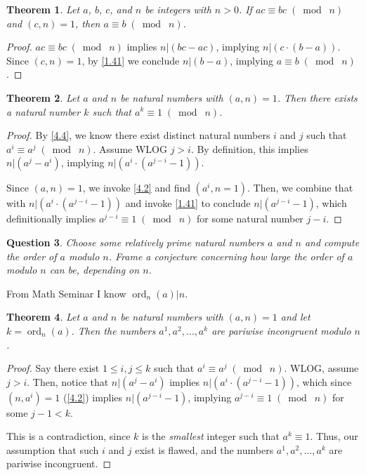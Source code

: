 \documentclass{article}
\DeclareMathOperator{\ord}{ord}
\newtheorem{thm}{Theorem}[section]
\newtheorem{ques}[thm]{Question}
\numberwithin{equation}{thm}
\providecommand{\gmod}[1]{\; (\bmod \; #1)}
\begin{document}
\begin{thm} \label{4.5}
  Let $a$, $b$, $c$, and $n$ be integers with $n > 0$. If $ac \equiv bc \gmod n$ and $(c, n) = 1$, then $a \equiv b \gmod n$.
\end{thm}

\begin{proof}
  $ac \equiv bc \gmod n$ implies $n | (bc - ac)$, implying $n | (c \cdot (b-a))$. Since $(c, n) = 1$, by \ref{1.41} we conclude $n | (b-a)$, implying $a \equiv b \gmod n$.
\end{proof}



\begin{thm} \label{4.6}
  Let $a$ and $n$ be natural numbers with $(a, n) = 1$. Then there exists a natural number $k$ such that $a^k \equiv 1 \gmod n$.
\end{thm}

\begin{proof}
  By \ref{4.4}, we know there exist distinct natural numbers $i$ and $j$ such that $a^i \equiv a^j \gmod n$. Assume WLOG $j > i$. By definition, this implies $n | (a^j - a^i)$, implying $n | (a^i \cdot (a^{j-i} - 1))$.

  Since $(a, n) = 1$, we invoke \ref{4.2} and find $(a^i, n = 1)$. Then, we combine that with $n | (a^i \cdot (a^{j-i} - 1))$ and invoke \ref{1.41} to conclude $n | (a^{j-i} - 1)$, which definitionally implies $a^{j-i} \equiv 1 \gmod n$ for some natural number $j-i$.
\end{proof}



\begin{ques} \label{4.7}
  Choose some relatively prime natural numbers $a$ and $n$ and compute the order of $a$ modulo $n$. Frame a conjecture concerning how large the order of $a$ modulo $n$ can be, depending on $n$.
\end{ques}

From Math Seminar I know $\ord_n (a) | n$.



\begin{thm} \label{4.8}
  Let $a$ and $n$ be natural numbers with $(a, n) = 1$ and let $k = \ord_n (a)$. Then the numbers $a^1, a^2, \ldots, a^k$ are pariwise incongruent modulo $n$.
\end{thm}

\begin{proof}
  Say there exist $1 \leq i, j \leq k$ such that $a^i \equiv a^j \gmod n$. WLOG, assume $j > i$. Then, notice that $n | (a^j - a^i)$ implies $n | (a^i \cdot (a^{j-i} - 1))$, which since $(n, a^i) = 1$ (\ref{4.2}) implies $n | (a^{j-i} - 1)$, implying $a^{j-i} \equiv 1 \gmod n$ for some $j-1 < k$.

  This is a contradiction, since $k$ is the \emph{smallest} integer such that $a^k \equiv 1$. Thus, our assumption that such $i$ and $j$ exist is flawed, and the numbers $a^1, a^2, \ldots, a^k$ are pariwise incongruent.
\end{proof}
\end{document}
